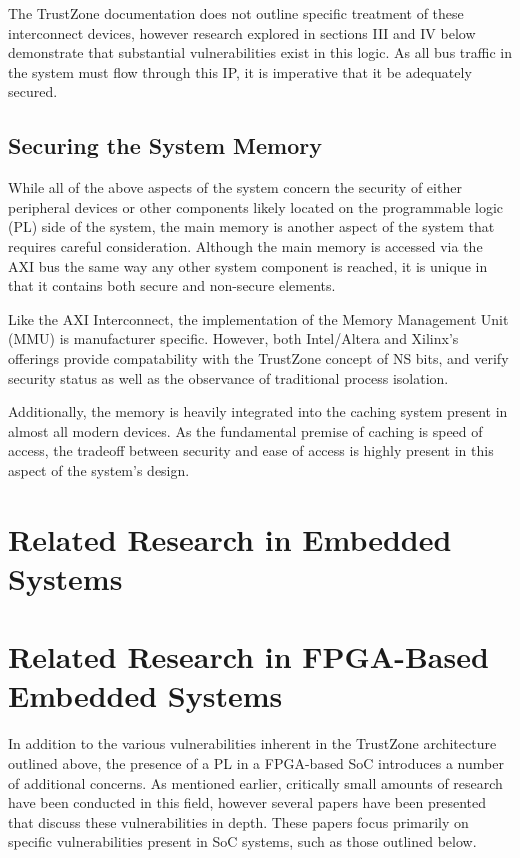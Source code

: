 \documentclass[journal]{IEEEtran}
\begin{document}
The TrustZone documentation does not outline specific treatment of these interconnect
devices, however research explored in sections III and IV below demonstrate that
substantial vulnerabilities exist in this logic. As all bus traffic in the system must
flow through this IP, it is imperative that it be adequately secured.

\subsection{Securing the System Memory}
While all of the above aspects of the system concern the security of either peripheral
devices or other components likely located on the programmable logic (PL) side of the 
system, the main memory is another aspect of the system that requires careful 
consideration. Although the main memory is accessed via the AXI bus the same way any other
system component is reached, it is unique in that it contains both secure and non-secure
elements.

Like the AXI Interconnect, the implementation of the Memory Management Unit (MMU) is
manufacturer specific. However, both Intel/Altera and Xilinx's offerings provide
compatability with the TrustZone concept of NS bits, and verify security status as well as
the observance of traditional process isolation. \cite{gross_breaking_2019}

Additionally, the memory is heavily integrated into the caching system present in almost
all modern devices. As the fundamental premise of caching is speed of access, the tradeoff
between security and ease of access is highly present in this aspect of the system's
design. 

\section{Related Research in Embedded Systems}

\section{Related Research in FPGA-Based Embedded Systems}
In addition to the various vulnerabilities inherent in the TrustZone architecture outlined
above, the presence of a PL in a FPGA-based SoC introduces a number of
additional concerns. As mentioned earlier, critically small amounts of research
have been conducted in this field, however several papers have been presented that discuss
these vulnerabilities in depth. These papers focus primarily on specific vulnerabilities
present in SoC systems, such as those outlined below.
\end{document}

